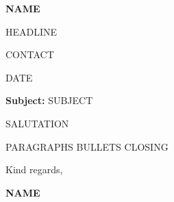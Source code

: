\documentclass[10pt,a4paper]{article}
\begin{document}
{\fontsize{20}{22}\selectfont\bfseries NAME}\par
{\large\color{accent}HEADLINE}\par
{\small CONTACT}\par
\vspace{5pt}
\hfill DATE\par
\vspace{5pt}
\textbf{Subject:} SUBJECT\par
SALUTATION\par
PARAGRAPHS
BULLETS
\vspace{1pt}
CLOSING\par
Kind regards,\par
\vspace{10pt}
\textbf{NAME}
\end{document}
